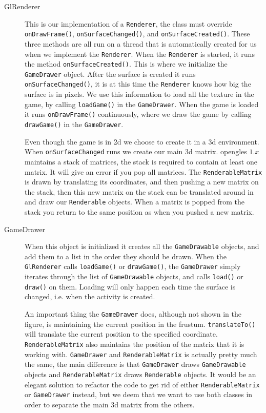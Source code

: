 \begin{description}

\item[GlRenderer] This is our implementation of a \lstinline|Renderer|, the class must override \lstinline|onDrawFrame()|, \lstinline|onSurfaceChanged()|, and \lstinline|onSurfaceCreated()|. These three methods are all run on a thread that is automatically created for us when we implement the \lstinline|Renderer|.  When the \lstinline|Renderer| is started, it runs the method \lstinline|onSurfaceCreated()|. This is where we initialize the \lstinline|GameDrawer| object. After the surface is created it runs \lstinline|onSurfaceChanged()|, it is at this time the \lstinline|Renderer| knows how big the surface is in pixels. We use this information to load all the texture in the game, by calling \lstinline|loadGame()| in the \lstinline|GameDrawer|. When the game is loaded it runs \lstinline|onDrawFrame()| continuously, where we draw the game by calling \lstinline|drawGame()| in the \lstinline|GameDrawer|.

Even though the game is in \ac{2d} we choose to create it in a \ac{3d} environment. When \lstinline|onSurfaceChanged| runs we create our main \ac{3d} matrix. \ac{opengles} $1.x$ maintains a stack of matrices, the stack is required to contain at least one matrix. It will give an error if you pop all matrices. The \lstinline|RenderableMatrix| is drawn by translating its coordinates, and then pushing a new matrix on the stack, then this new matrix on the stack can be translated around in and draw our \lstinline|Renderable| objects. When a matrix is popped from the stack you return to the same position as when you pushed a new matrix.\citep{openglspecs}

\item[GameDrawer] When this object is initialized it creates all the \lstinline|GameDrawable| objects, and add them to a list in the order they should be drawn. When the \lstinline|GlRenderer| calls \lstinline|loadGame()| or \lstinline|drawGame()|, the \lstinline|GameDrawer| simply iterates through the list of \lstinline|GameDrawable| objects, and calls \lstinline|load()| or \lstinline|draw()| on them. Loading will only happen each time the surface is changed, i.e. when the activity is created.

An important thing the \lstinline|GameDrawer| does, although not shown in the figure, is maintaining the current position in the frustum. \lstinline|translateTo()| will translate the current position to the specified coordinate. \lstinline|RenderableMatrix| also maintains the position of the matrix that it is working with. \lstinline|GameDrawer| and \lstinline|RenderableMatrix| is actually pretty much the same, the main difference is that \lstinline|GameDrawer| draws \lstinline|GameDrawable| objects and \lstinline|RenderableMatrix| draws \lstinline|Renderable| objects. It would be an elegant solution to refactor the code to get rid of either \lstinline|RenderableMatrix| or \lstinline|GameDrawer| instead, but we deem that we want to use both classes in order to separate the main \ac{3d} matrix from the others.


\end{description}
